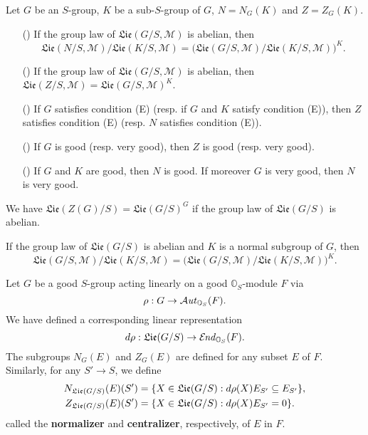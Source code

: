 \begin{theorem}\label{scheme group normalizer and centralizer Lie prop}
Let $G$ be an $S$-group, $K$ be a sub-$S$-group of $G$, $N=N_G(K)$ and $Z=Z_G(K)$.
\begin{enumerate}
    \item[(\rmnum{1})] If the group law of $\mathfrak{Lie}(G/S,\mathscr{M})$ is abelian, then
    \[\mathfrak{Lie}(N/S,\mathscr{M})/\mathfrak{Lie}(K/S,\mathscr{M})=\big(\mathfrak{Lie}(G/S,\mathscr{M})/\mathfrak{Lie}(K/S,\mathscr{M})\big)^K.\]
    \item[(\rmnum{2})] If the group law of $\mathfrak{Lie}(G/S,\mathscr{M})$ is abelian, then $\mathfrak{Lie}(Z/S,\mathscr{M})=\mathfrak{Lie}(G/S,\mathscr{M})^K$.
    \item[(\rmnum{3})] If $G$ satisfies condition (E) (resp. if $G$ and $K$ satisfy condition (E)), then $Z$ satisfies condition (E) (resp. $N$ satisfies condition (E)).
    \item[(\rmnum{4})] If $G$ is good (resp. very good), then $Z$ is good (resp. very good).
    \item[(\rmnum{5})] If $G$ and $K$ are good, then $N$ is good. If moreover $G$ is very good, then $N$ is very good.
\end{enumerate}
\end{theorem}

\begin{corollary}\label{scheme group Lie of centralizer char}
We have $\mathfrak{Lie}(Z(G)/S)=\mathfrak{Lie}(G/S)^G$ if the group law of $\mathfrak{Lie}(G/S)$ is abelian.
\end{corollary}

\begin{corollary}\label{scheme group normal subgroup Lie invariant under Ad}
If the group law of $\mathfrak{Lie}(G/S)$ is abelian and $K$ is a normal subgroup of $G$, then
\[\mathfrak{Lie}(G/S,\mathscr{M})/\mathfrak{Lie}(K/S,\mathscr{M})=\big(\mathfrak{Lie}(G/S,\mathscr{M})/\mathfrak{Lie}(K/S,\mathscr{M})\big)^K.\]
\end{corollary}

Let $G$ be a good $S$-group acting linearly on a good $\mathbb{O}_S$-module $F$ via
\[\rho:G\to\operatorname{\mathcal{A}\hspace*{-0.2pt}\textit{ut}\hspace{0.5pt}}_{\mathbb{O}_S}(F).\]
We have defined a corresponding linear representation
\[d\rho:\mathfrak{Lie}(G/S)\to\operatorname{\mathcal{E}\hspace*{-1pt}\textit{nd}\hspace{0.5pt}}_{\mathbb{O}_S}(F).\]
The subgroups $N_G(E)$ and $Z_G(E)$ are defined for any subset $E$ of $F$. Similarly, for any $S'\to S$, we define
\begin{align*}
N_{\mathfrak{Lie}(G/S)}(E)(S')&=\{X\in\mathfrak{Lie}(G/S):d\rho(X)E_{S'}\subseteq E_{S'}\},\\
Z_{\mathfrak{Lie}(G/S)}(E)(S')&=\{X\in\mathfrak{Lie}(G/S):d\rho(X)E_{S'}=0\}.
\end{align*}
called the \textbf{normalizer} and \textbf{centralizer}, respectively, of $E$ in $F$.

